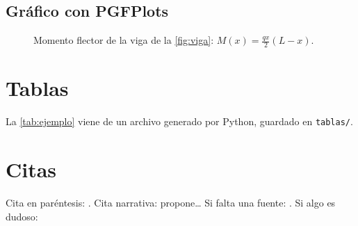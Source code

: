 \subsection{Gráfico con PGFPlots}

\begin{figure}[htbp]
  \centering
  \caption{Momento flector de la viga de la \cref{fig:viga}: $M(x) = \tfrac{q x}{2}(L-x)$.}
  \label{fig:momento}
\end{figure}

\section{Tablas}

La \cref{tab:ejemplo} viene de un archivo generado por Python, guardado en \texttt{tablas/}.
\begin{table}[htbp]
  \centering
  \caption{Tabla generada automáticamente desde \texttt{04\_analisis}.}
  \label{tab:ejemplo}
  
\end{table}

\section{Citas}

Cita en paréntesis: \parencite{chopra2017dynamics}. Cita narrativa: \textcite{chow1959open} propone\dots
Si falta una fuente: .
Si algo es dudoso: 
